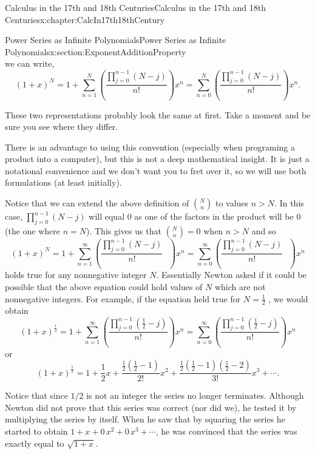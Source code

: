 \begin{chapterptx}{Calculus in the 17th and 18th Centuries}{}{Calculus in the 17th and 18th Centuries}{}{}{x:chapter:CalcIn17th18thCentury}
\begin{sectionptx}{Power Series as Infinite Polynomials}{}{Power Series as Infinite Polynomials}{}{}{x:section:ExponentAdditionProperty}
\begin{equation*}
		\end{equation*}
		we can write,%
		\begin{equation*}
			\left(1+x\right)^N=1+\sum_{n=1}^N\left(\frac{\prod_{j=0}^{n-1}\left(N-j\right)}{n!}\right)x^n = \sum_{n=0}^N\left(\frac{\prod_{j=0}^{n-1}\left(N-j\right)}{n!}\right)x^n\text{.}
		\end{equation*}
		\par
		These two representations probably look the same at first. Take a moment and be sure you see where they differ.%
		\par
		There is an advantage to using this convention (especially when programing a product into a computer), but this is not a deep mathematical insight. It is just a notational convenience and we don't want you to fret over it, so we will use both formulations (at least initially).%
		\par
		Notice that we can extend the above definition of \(\binom{N}{n}\) to values \(n>N\). In this case, \(\prod_{j=0}^{n-1}\left(N-j\right)\) will equal 0 as one of the factors in the product will be \(0\) (the one where \(n=N\)). This gives us that \(\binom{N}{n}=0\) when \(n>N\) and so%
		\begin{equation*}
			\left(1+x\right)^N=1+\sum_{n=1}^\infty\left(\frac{\prod_{j=0}^{n-1}\left(N-j\right)}{n!}\text{ } \right)x^n= \sum_{n=0}^\infty\left(\frac{\prod_{j=0}^{n-1}\left(N-j\right)}{n!}\text{ } \right)x^n
		\end{equation*}
		holds true for any nonnegative integer \(N\). Essentially Newton asked if it could be possible that the above equation could hold values of \(N\) which are not nonnegative integers. For example, if the equation held true for \(N=\frac{1}{2}\) , we would obtain%
		\begin{equation*}
			\left(1+x\right)^{\frac{1}{2}}=1+\sum_{n=1}^\infty\left(\frac{ \prod_{j=0}^{n-1}\left(\frac{1}{2}-j\right)}{n!}\right)x^n=\sum_{n=0}^\infty\left(\frac{ \prod_{j=0}^{n-1}\left(\frac{1}{2}-j\right)}{n!}\right)x^n
		\end{equation*}
		or%
		\begin{equation}
			\left(1+x\right)^{\frac{1}{2}}=1+\frac{1}{2}x+\frac{\frac{1}{2}\left(\frac{1}{2}-1\right)}{2!}x^2+\frac{\frac{1}{2}\left(\frac{1}{2}-1\right)\left(\frac{1}{2}-2\right)}{3!}x^3+\cdots\text{.}\label{x:men:eq_BinomialSeries}
		\end{equation}
		\par
		Notice that since \(1/2\) is not an integer the series no longer terminates. Although Newton did not prove that this series was correct (nor did we), he tested it by multiplying the series by itself. When he saw that by squaring the series he started to obtain \(1+x+0\,x^2+0\,x^3+\cdots\), he was convinced that the series was exactly equal to \(\sqrt{1+x}\).%

\end{sectionptx}
\end{chapterptx}
